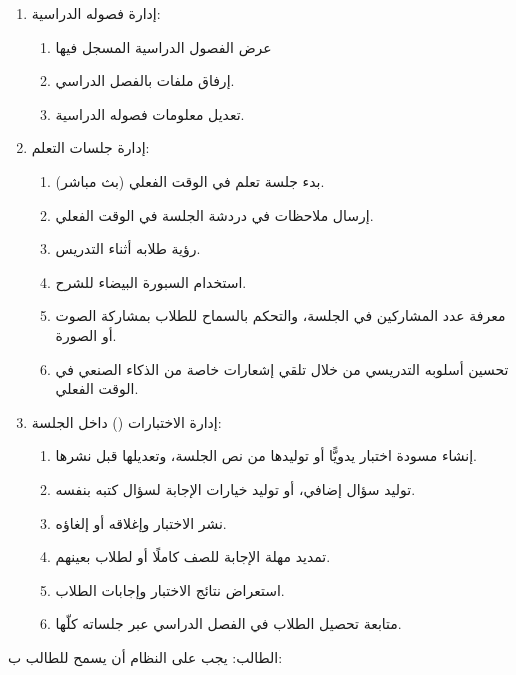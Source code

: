 \begin{enumerate}
  \item إدارة فصوله الدراسية:
  \begin{enumerate}
    \item عرض الفصول الدراسية المسجل فيها
    \item إرفاق ملفات بالفصل الدراسي.
    \item تعديل معلومات فصوله الدراسية.
  \end{enumerate}
  \item إدارة جلسات التعلم:
  \begin{enumerate}
    \item بدء جلسة تعلم في الوقت الفعلي (بث مباشر).
    \item إرسال ملاحظات في دردشة الجلسة في الوقت الفعلي.
    \item رؤية طلابه أثناء التدريس.
    \item استخدام السبورة البيضاء  للشرح.
    \item معرفة عدد المشاركين في الجلسة، والتحكم بالسماح للطلاب بمشاركة الصوت أو الصورة.
    \item تحسين أسلوبه التدريسي من خلال تلقي إشعارات خاصة من الذكاء الصنعي في الوقت الفعلي.
  \end{enumerate}
  \item إدارة الاختبارات () داخل الجلسة:
  \begin{enumerate}
    \item إنشاء مسودة اختبار يدويًّا أو توليدها من نص الجلسة، وتعديلها قبل نشرها.
    \item توليد سؤال إضافي، أو توليد خيارات الإجابة لسؤال كتبه بنفسه.
    \item نشر الاختبار وإغلاقه أو إلغاؤه.
    \item تمديد مهلة الإجابة للصف كاملًا أو لطلاب بعينهم.
    \item استعراض نتائج الاختبار وإجابات الطلاب.
    \item متابعة تحصيل الطلاب في الفصل الدراسي عبر جلساته كلّها.
  \end{enumerate}
\end{enumerate}

\noindent الطالب: يجب على النظام أن يسمح للطالب ب:

